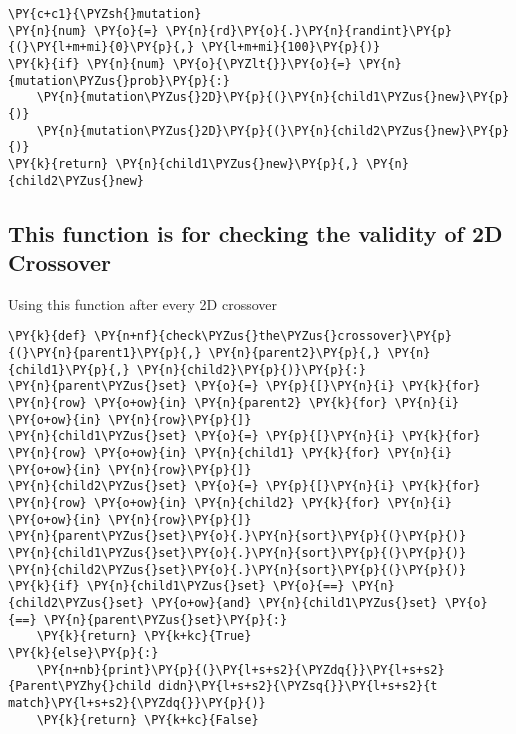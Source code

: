 \begin{tcolorbox}[breakable, size=fbox, boxrule=1pt, pad at break*=1mm,colback=cellbackground, colframe=cellborder]
\begin{Verbatim}[commandchars=\\\{\}]
\PY{c+c1}{\PYZsh{}mutation}
\PY{n}{num} \PY{o}{=} \PY{n}{rd}\PY{o}{.}\PY{n}{randint}\PY{p}{(}\PY{l+m+mi}{0}\PY{p}{,} \PY{l+m+mi}{100}\PY{p}{)}
\PY{k}{if} \PY{n}{num} \PY{o}{\PYZlt{}}\PY{o}{=} \PY{n}{mutation\PYZus{}prob}\PY{p}{:}
    \PY{n}{mutation\PYZus{}2D}\PY{p}{(}\PY{n}{child1\PYZus{}new}\PY{p}{)}
    \PY{n}{mutation\PYZus{}2D}\PY{p}{(}\PY{n}{child2\PYZus{}new}\PY{p}{)}
\PY{k}{return} \PY{n}{child1\PYZus{}new}\PY{p}{,} \PY{n}{child2\PYZus{}new}
\end{Verbatim}
\end{tcolorbox}

\subsection*{This function is for checking the validity of 2D
Crossover}\label{this-function-is-for-checking-the-validity-of-2d-crossover}

Using this function after every 2D crossover

\begin{tcolorbox}[breakable, size=fbox, boxrule=1pt, pad at break*=1mm,colback=cellbackground, colframe=cellborder]
\begin{Verbatim}[commandchars=\\\{\}]
\PY{k}{def} \PY{n+nf}{check\PYZus{}the\PYZus{}crossover}\PY{p}{(}\PY{n}{parent1}\PY{p}{,} \PY{n}{parent2}\PY{p}{,} \PY{n}{child1}\PY{p}{,} \PY{n}{child2}\PY{p}{)}\PY{p}{:}
\PY{n}{parent\PYZus{}set} \PY{o}{=} \PY{p}{[}\PY{n}{i} \PY{k}{for} \PY{n}{row} \PY{o+ow}{in} \PY{n}{parent2} \PY{k}{for} \PY{n}{i} \PY{o+ow}{in} \PY{n}{row}\PY{p}{]}
\PY{n}{child1\PYZus{}set} \PY{o}{=} \PY{p}{[}\PY{n}{i} \PY{k}{for} \PY{n}{row} \PY{o+ow}{in} \PY{n}{child1} \PY{k}{for} \PY{n}{i} \PY{o+ow}{in} \PY{n}{row}\PY{p}{]}
\PY{n}{child2\PYZus{}set} \PY{o}{=} \PY{p}{[}\PY{n}{i} \PY{k}{for} \PY{n}{row} \PY{o+ow}{in} \PY{n}{child2} \PY{k}{for} \PY{n}{i} \PY{o+ow}{in} \PY{n}{row}\PY{p}{]}
\PY{n}{parent\PYZus{}set}\PY{o}{.}\PY{n}{sort}\PY{p}{(}\PY{p}{)}
\PY{n}{child1\PYZus{}set}\PY{o}{.}\PY{n}{sort}\PY{p}{(}\PY{p}{)}
\PY{n}{child2\PYZus{}set}\PY{o}{.}\PY{n}{sort}\PY{p}{(}\PY{p}{)}
\PY{k}{if} \PY{n}{child1\PYZus{}set} \PY{o}{==} \PY{n}{child2\PYZus{}set} \PY{o+ow}{and} \PY{n}{child1\PYZus{}set} \PY{o}{==} \PY{n}{parent\PYZus{}set}\PY{p}{:}
    \PY{k}{return} \PY{k+kc}{True}
\PY{k}{else}\PY{p}{:}
    \PY{n+nb}{print}\PY{p}{(}\PY{l+s+s2}{\PYZdq{}}\PY{l+s+s2}{Parent\PYZhy{}child didn}\PY{l+s+s2}{\PYZsq{}}\PY{l+s+s2}{t match}\PY{l+s+s2}{\PYZdq{}}\PY{p}{)}
    \PY{k}{return} \PY{k+kc}{False}
\end{Verbatim}
\end{tcolorbox}

